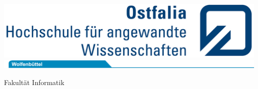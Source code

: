 


\frontmatter
\begin{titlepage}


	\thispagestyle{titlepage}
	
	\hfill
	\includegraphics[scale=0.93]{./images/logos/logo_ostfalia.jpg}
	\includegraphics[scale=1.20]{./images/logos/sublogo_wf.jpg}
	
	\hspace{1cm}
	\begin{minipage}{\dimexpr\textwidth-1.5cm\relax}
		{\Large\textsf{Fakultät Informatik}}
	\end{minipage}
	
	\vfil
	

	\hspace{1cm}
	\begin{minipage}{\dimexpr\textwidth-1.5cm\relax}
		\hrulefill
		
		\vspace{2em}
		
		{\Large\textbf{\textsf{\documentSubject}}}
			
		\vspace{2em}
			
		{\Huge\textbf{\textsf{\documentTitle}}}
			
		\vspace{2em}
			
		{\Large\textsf{\documentSubtitle}}
		
		\vspace{1em}
		
		\hrulefill
	\end{minipage}	
	
	\vfil
	

\end{titlepage}
